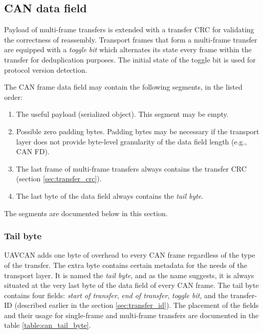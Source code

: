 \subsection{CAN data field}

Payload of multi-frame transfers is extended with a transfer CRC for validating the correctness of reassembly.
Transport frames that form a multi-frame transfer are equipped with a \emph{toggle bit}
which alternates its state every frame within the transfer for deduplication purposes.
The initial state of the toggle bit is used for protocol version detection.

The CAN frame data field may contain the following segments, in the listed order:
\begin{samepage}
\begin{enumerate}
    \item The useful payload (serialized object). This segment may be empty.
    \item Possible zero padding bytes.
          Padding bytes may be necessary if the transport layer does not provide byte-level
          granularity of the data field length (e.g., CAN FD).
    \item The last frame of multi-frame transfers always contains the transfer CRC (section \ref{sec:transfer_crc}).
    \item The last byte of the data field always contains the \emph{tail byte}.
\end{enumerate}
\end{samepage}
The segments are documented below in this section.

\subsubsection{Tail byte}

UAVCAN adds one byte of overhead to every CAN frame regardless of the type of the transfer.
The extra byte contains certain metadata for the needs of the transport layer.
It is named the \emph{tail byte}, and as the name suggests, it is always situated
at the very last byte of the data field of every CAN frame.
The tail byte contains four fields: \emph{start of transfer}, \emph{end of transfer},
\emph{toggle bit}, and the transfer-ID (described earlier in the section \ref{sec:transfer_id}).
The placement of the fields and their usage for single-frame and multi-frame transfers
are documented in the table \ref{table:can_tail_byte}.

